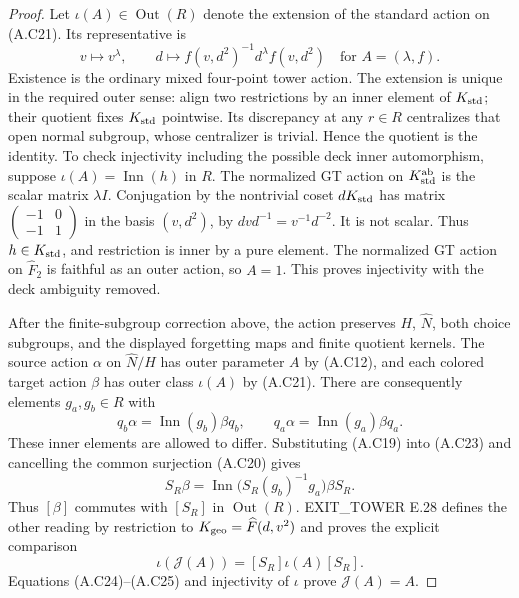 \begin{proof}
Let $\iota(A)\in\operatorname{Out}(R)$ denote the extension
of the standard action on (A.C21).  Its representative is
\[
 v\longmapsto v^\lambda,\qquad
 d\longmapsto f(v,d^2)^{-1}d^\lambda f(v,d^2)
 \quad\text{for }A=(\lambda,f).                          \tag{A.C22}
\]
Existence is the ordinary mixed four-point tower action.
The extension is unique in the required outer sense:
align two restrictions by an inner element of $K_{\rm std}$;
their quotient fixes $K_{\rm std}$ pointwise.  Its
discrepancy at any $r\in R$ centralizes that open normal
subgroup, whose centralizer is trivial.  Hence the
quotient is the identity.  To check injectivity including
the possible deck inner automorphism, suppose
$\iota(A)=\operatorname{Inn}(h)$ in $R$.
The normalized GT action on $K_{\rm std}^{\rm ab}$ is
the scalar matrix $\lambda I$.  Conjugation by the
nontrivial coset $dK_{\rm std}$ has matrix
$\left(\begin{smallmatrix}-1&0\\-1&1\end{smallmatrix}\right)$
in the basis $(v,d^2)$, by $dvd^{-1}=v^{-1}d^{-2}$.
It is not scalar.  Thus $h\in K_{\rm std}$, and
restriction is inner by a pure element.  The normalized
GT action on $\widehat F_2$ is faithful as an outer
action, so $A=1$.  This proves injectivity with the
deck ambiguity removed.

After the finite-subgroup correction above, the action
preserves $H$, $\widehat N$, both choice subgroups, and
the displayed forgetting maps and finite quotient kernels.
The source action $\alpha$ on $\widehat N/H$ has outer
parameter $A$ by (A.C12), and each colored target action
$\beta$ has outer class $\iota(A)$ by (A.C21).
There are consequently elements $g_a,g_b\in R$ with
\[
 q_b\alpha=\operatorname{Inn}(g_b)\beta q_b,
 \qquad q_a\alpha=\operatorname{Inn}(g_a)\beta q_a.
                                                               \tag{A.C23}
\]
These inner elements are allowed to differ.  Substituting
(A.C19) into (A.C23) and cancelling the common
surjection (A.C20) gives
\[
 S_R\beta
  =\operatorname{Inn}\bigl(S_R(g_b)^{-1}g_a\bigr)\beta S_R.
                                                               \tag{A.C24}
\]
Thus $[\beta]$ commutes with $[S_R]$ in
$\operatorname{Out}(R)$.  EXIT\_TOWER E.28 defines the
other reading by restriction to
$K_{\rm geo}=\widehat F(d,v^2)$ and proves the explicit
comparison
\[
 \iota(\mathcal J(A))=[S_R]\iota(A)[S_R].                 \tag{A.C25}
\]
Equations (A.C24)--(A.C25) and injectivity of $\iota$
prove $\mathcal J(A)=A$.


\end{proof}
